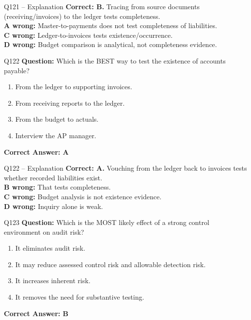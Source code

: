 \documentclass[aspectratio=169,10pt]{beamer}
\begin{document}
	\begin{frame}[t]{Q121 -- Explanation}
		\small
		\textbf{Correct: B.} Tracing from source documents (receiving/invoices) to the ledger tests completeness. \\[4pt]
		\textbf{A wrong:} Master-to-payments does not test completeness of liabilities. \\[2pt]
		\textbf{C wrong:} Ledger-to-invoices tests existence/occurrence. \\[2pt]
		\textbf{D wrong:} Budget comparison is analytical, not completeness evidence.
	\end{frame}
	
	\begin{frame}[t]{Q122}
		\small
		\textbf{Question:} Which is the BEST way to test the existence of accounts payable?
		\begin{enumerate}[label=\Alph*.,itemsep=1pt,topsep=2pt]
			\item From the ledger to supporting invoices.
			\item From receiving reports to the ledger.
			\item From the budget to actuals.
			\item Interview the AP manager.
		\end{enumerate}
		\vspace{4pt}
		\textbf{Correct Answer: A}
	\end{frame}
	
	\begin{frame}[t]{Q122 -- Explanation}
		\small
		\textbf{Correct: A.} Vouching from the ledger back to invoices tests whether recorded liabilities exist. \\[4pt]
		\textbf{B wrong:} That tests completeness. \\[2pt]
		\textbf{C wrong:} Budget analysis is not existence evidence. \\[2pt]
		\textbf{D wrong:} Inquiry alone is weak.
	\end{frame}
	
	\begin{frame}[t]{Q123}
		\small
		\textbf{Question:} Which is the MOST likely effect of a strong control environment on audit risk?
		\begin{enumerate}[label=\Alph*.,itemsep=1pt,topsep=2pt]
			\item It eliminates audit risk.
			\item It may reduce assessed control risk and allowable detection risk.
			\item It increases inherent risk.
			\item It removes the need for substantive testing.
		\end{enumerate}
		\vspace{4pt}
		\textbf{Correct Answer: B}
	\end{frame}
	
\end{document}
